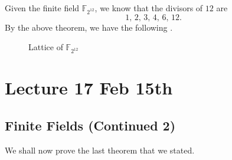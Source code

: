 \documentclass[notoc,notitlepage,nobib]{tufte-book}
\begin{document}
\begin{eg}
  Given the finite field $\mathbb{F}_{2^{12}}$, we know that the divisors of $12$ are
  \begin{equation*}
    1, \, 2, \, 3, \, 4, \, 6, \, 12.
  \end{equation*}
  By the above theorem, we have the following . 
  \begin{figure}[ht]
    \centering
    \caption{Lattice of $\mathbb{F}_{2^12}$}
    \label{fig:lattice_of_f__2_12_}
  \end{figure}
\end{eg}




\chapter{Lecture 17 Feb 15th}%
\label{chp:lecture_17_feb_15th}

\section{Finite Fields (Continued 2)}%
\label{sec:finite_fields_continued_2}

We shall now prove the last theorem that we stated.
\end{document}
